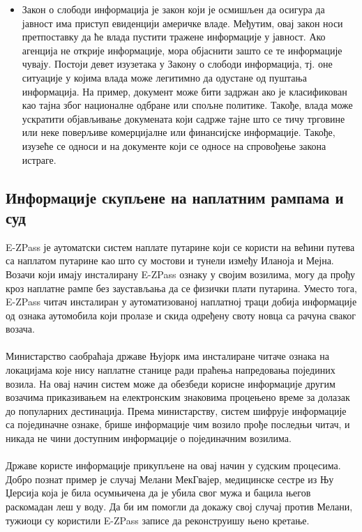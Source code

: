 \documentclass{article}
\begin{document}
\begin{itemize}
  \item Закон о слободи информација је закон који је осмишљен да осигура да јавност има приступ евиденцији америчке владе. Међутим, овај закон носи претпоставку да ће влада пустити тражене информације у јавност. Ако агенција не открије информације, мора објаснити зашто се те информације чувају. Постоји девет изузетака у Закону о слободи информација, тј. оне ситуације у којима влада може легитимно да одустане од пуштања информација. На пример, документ може бити задржан ако је класификован као тајна због националне одбране или спољне политике. Такође, влада може ускратити објављивање докумената који садрже тајне што се тичу трговине или неке поверљиве комерцијалне или финансијске информације. Такође, изузеће се односи и на документе који се односе на спровођење закона истраге.
\end{itemize}

\newpage
\subsection{Информације скупљене на наплатним рампама и суд}
E-ZPass је аутоматски систем наплате путарине који се користи на већини путева са наплатом путарине као што су мостови и тунели између Иланоја и Мејна. Возачи који имају инсталирану E-ZPass ознаку у својим возилима, могу да прођу кроз наплатне рампе без заустављања да се физички плати путарина. Уместо тога, E-ZPass читач инсталиран у аутоматизованој наплатној траци добија информације од ознака аутомобила који пролазе и скида одређену своту новца са рачуна сваког возача. 
\\\\
Министарство саобраћаја државе Њујорк има инсталиране читаче ознака на локацијама које нису наплатне станице ради праћења напредовања појединих возила. На овај начин систем може да обезбеди корисне информације другим возачима приказивањем на електронским знаковима процењено време за долазак до популарних дестинација. Према министарству, систем шифрује информације са појединачне ознаке, брише информације чим возило прође последњи читач, и никада не чини доступним информације о појединачним возилима.
\\\\
Државе користе информације прикупљене на овај начин у судским процесима. Добро познат пример је случај Мелани МекГвајер, медицинске сестре из Њу Џерсија која је била осумњичена да је убила свог мужа и бацила његов раскомадан леш у воду. Да би им помогли да докажу свој случај против Мелани, тужиоци су користили E-ZPass записе да реконструишу њено кретање. 
\end{document}
